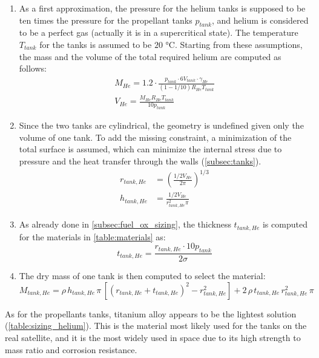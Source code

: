 \begin{enumerate}[itemsep=5mm]
    \item
    As a first approximation, the pressure for the helium tanks is supposed to be ten times the pressure for the propellant tanks $p_{tank}$, and helium is considered to be a perfect gas (actually it is in a supercritical state).
    The temperature $T_{tank}$ for the tanks is assumed to be $20$ °C. Starting from these assumptions, the mass and the volume of the total required helium are computed as follows:
    \begin{gather}
        M_{He} = 1.2 \cdot \frac{p_{tank} \cdot 6 V_{tank} \cdot \gamma_{He}}{\left( 1 - 1/10 \right) R_{He} T_{tank}}
        \\
        V_{He} = \frac{M_{He} R_{He} T_{tank}}{10 p_{tank}}
    \end{gather}

    \item
    Since the two tanks are cylindrical, the geometry is undefined given only the volume of one tank. To add the missing constraint, a minimization of the total surface is assumed, which can minimize the internal stress due to pressure and the heat transfer through the walls (\autoref{subsec:tanks}).
    \begin{align}
        r_{tank,He} &= \left( \frac{1/2 V_{He}}{2 \pi} \right)^{1/3}
        \\
        h_{tank,He} &= \frac{1/2 V_{He}}{r_{tank,He}^2 \pi}
    \end{align}

    \item
    As already done in \autoref{subsec:fuel_ox_sizing}, the thickness $t_{tank,He}$ is computed for the materials in \autoref{table:materials} as:
    \begin{equation}
        t_{tank,He} = \frac{r_{tank,He} \cdot 10 p_{tank}}{2 \sigma}
    \end{equation}

    \item
    The dry mass of one tank is then computed to select the material:
    \begin{equation}
        M_{tank,He} = \rho \, h_{tank,He} \, \pi \, \left[ \left( r_{tank,He} + t_{tank,He} \right)^2 - r_{tank,He}^2 \right] + 2 \, \rho \, t_{tank,He} \, r_{tank,He}^2 \, \pi
    \end{equation}
\end{enumerate}

As for the propellants tanks, titanium alloy appears to be the lightest solution (\autoref{table:sizing_helium}). This is the material most likely used for the tanks on the real satellite, and it is the most widely used in space due to its high strength to mass ratio and corrosion resistance.

